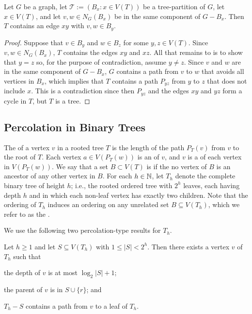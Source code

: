 \documentclass{patmorin}
\renewcommand{\le}{\leqslant}
\renewcommand{\ge}{\geqslant}
\begin{document}
\begin{obs}\label{tree_thingy}
  Let $G$ be a graph, let $\mathcal{T}:=(B_x:x\in V(T))$ be a tree-partition of $G$, let $x\in V(T)$, and let $v,w\in N_G(B_x)$ be in the same component of $G-B_x$.  Then $T$ contains an edge $xy$ with $v,w\in B_y$.
\end{obs}

\begin{proof}
  Suppose that $v\in B_y$ and $w\in B_z$ for some $y,z\in V(T)$.  Since $v,w\in N_G(B_x)$, $T$ contains the edges $xy$ and $xz$.  All that remains to is to show that $y=z$ so, for the purpose of contradiction, assume $y\neq z$.  Since $v$ and $w$ are in the same component of $G-B_x$, $G$ contains a path from $v$ to $w$ that avoids all vertices in $B_x$, which implies that $T$ contains a path $P_{yz}$ from $y$ to $z$ that does not include $x$.  This is a contradiction since then $P_{yz}$ and the edges $xy$ and $yz$ form a cycle in $T$, but $T$ is a tree.
\end{proof}

\subsection{Percolation in Binary Trees}


The  of a vertex $v$ in a rooted tree $T$ is the length of the path $P_T(v)$ from $v$ to the root of $T$.  Each vertex $a\in V(P_T(w))$ is an  of $v$, and $v$ is a  of each vertex in $V(P_T(w))$.  We say that a set $B\subset V(T)$ is  if the no vertex of $B$ is an ancestor of any other vertex in $B$.  For each $h\in\mathbb{N}$, let $T_h$ denote the complete binary tree of height $h$; i.e., the rooted ordered tree with $2^h$ leaves, each having depth $h$ and in which each non-leaf vertex has exactly two children.  Note that the ordering of $T_h$ induces an ordering on any unrelated set $B\subseteq V(T_h)$, which we refer to as the .

We use the following two percolation-type results for $T_h$.

\begin{lem}\label{one_path}
  Let $h\ge 1$
  and let $S\subseteq V(T_h)$ with $1\le |S|< 2^h$. Then there exists a vertex $v$ of $T_h$ such that
  \begin{compactenum}[(i)]
    \item the depth of $v$ is at most $\log_2|S|+1$;
    \item the parent of $v$ is in $S\cup\{r\}$; and
    \item $T_h-S$ contains a path from $v$ to a leaf of $T_h$.
  \end{compactenum}
\end{lem}
\end{document}
